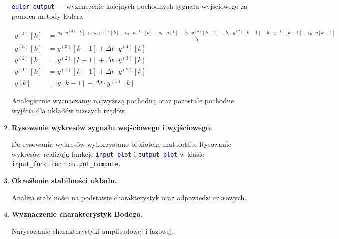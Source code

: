 \documentclass[10pt, a4paper]{article}
\begin{document}
\begin{enumerate}[label=\alph*.]
\vspace{0.1cm}

\textcolor{blue}{\texttt{euler\_output}} --- wyznaczenie kolejnych pochodnych sygnału wyjściowego za pomocą metody Eulera

{\footnotesize
\begin{align*}
y^{(4)}[k] &= \frac{a_3 \cdot u^{(3)}[k] + a_2 \cdot u^{(2)}[k] + a_1 \cdot u^{(1)}[k] + a_0 \cdot u[k] - b_3 \cdot y^{(3)}[k-1] - b_2 \cdot y^{(2)}[k-1] - b_1 \cdot y^{(1)}[k-1] - b_0 \cdot y[k-1]}{b_4} \\
y^{(3)}[k] &= y^{(3)}[k-1] + \Delta t \cdot y^{(4)}[k] \\
y^{(2)}[k] &= y^{(2)}[k-1] + \Delta t \cdot y^{(3)}[k] \\
y^{(1)}[k] &= y^{(1)}[k-1] + \Delta t \cdot y^{(2)}[k] \\
y[k] &= y[k-1] + \Delta t \cdot y^{(1)}[k]
\end{align*}
}

Analogicznie wyznaczamy najwyższą pochodną oraz pozostałe pochodne wyjścia dla układów niższych rzędów.

  \vspace{0.2cm}

  \item \textbf{Rysowanie wykresów sygnału wejściowego i wyjściowego.} \par\vspace{0.1cm}
  Do rysowania wykresów wykorzystano bibliotekę matplotlib. Rysowanie wykresów realizują funkcje \textcolor{blue}{\texttt{input\_plot}} i \textcolor{blue}{\texttt{output\_plot}}
  w klasie {\texttt{input\_function}} i {\texttt{output\_compute}}.

  \vspace{0.2cm}
  
  \item \textbf{Określenie stabilności układu.} \par\vspace{0.1cm}
  Analiza stabilności na podstawie charakterystyk oraz odpowiedzi czasowych.



  \vspace{0.2cm}

  \item \textbf{Wyznaczenie charakterystyk Bodego.} \par\vspace{0.1cm}
  Narysowanie charakterystyki amplitudowej i fazowej.
\end{enumerate}
\end{document}

